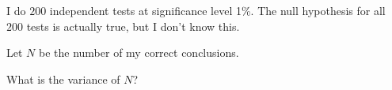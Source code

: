 
\begin{question}
I do \(200\) independent tests at significance level 1\%.
The null hypothesis for all \(200\)
tests is actually true, but I don't know this.

Let \(N\) be the number of my correct conclusions.

What is the variance of \(N\)?
\end{question}



